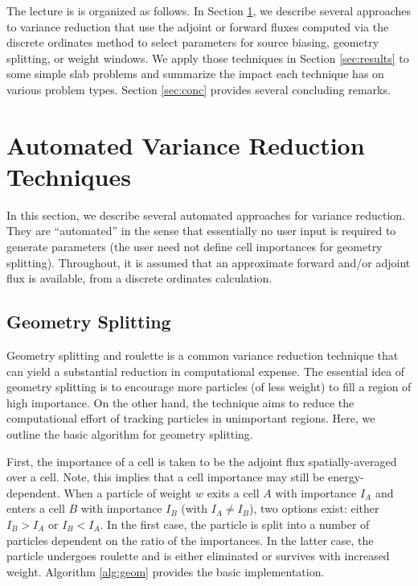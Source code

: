 The lecture is is organized as follows.  In Section \ref{sec:tech}, we
describe several approaches to variance reduction that use the adjoint or
forward fluxes computed via the discrete ordinates method to select parameters
for source biasing, geometry splitting, or weight windows. We apply those
techniques in Section \ref{sec:results} to some simple slab problems and
summarize the impact each technique has on various problem types. Section
\ref{sec:conc} provides several concluding remarks.  

\section{Automated Variance Reduction Techniques}
\label{sec:tech}

In this section, we describe several automated approaches for variance
reduction.  They are ``automated'' in the sense that essentially no user input
is required to generate parameters (\eg the user need not define cell
importances for geometry splitting).  Throughout, it is assumed that an
approximate forward and/or adjoint flux is available, \eg from a discrete
ordinates calculation.

\subsection{Geometry Splitting}

Geometry splitting and roulette is a common variance reduction technique that
can yield a substantial reduction in computational expense.  The essential idea
of geometry splitting is to encourage more particles (of less weight) to fill a
region of high importance.  On the other hand, the technique aims to reduce the
computational effort of tracking particles in unimportant regions.  Here, we
outline the basic algorithm for geometry splitting.

First, the importance of a cell is taken to be the adjoint flux
spatially-averaged over a cell.  Note, this implies that a cell importance may
still be energy-dependent.  When a particle of weight $w$  exits a cell $A$ with
importance $I_A$ and enters a cell $B$ with importance $I_B$ (with $I_A \neq
I_B$), two options exist: either $I_B > I_A$ or $I_B < I_A$.  In the first case,
the particle is split into a number of particles dependent on the ratio of the
importances.  In the latter case, the particle undergoes roulette and is either
eliminated or survives with increased weight. Algorithm \ref{alg:geom} provides
the basic implementation. 

